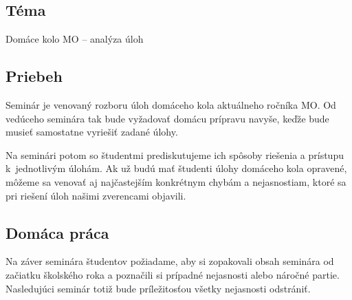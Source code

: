 
\subsection*{Téma}
Domáce kolo MO -- analýza úloh

\subsection*{Priebeh}
Seminár je venovaný rozboru úloh domáceho kola aktuálneho ročníka MO. Od vedúceho seminára tak bude vyžadovať domácu prípravu navyše, keďže bude musieť samostatne vyriešiť zadané úlohy.

Na seminári potom so študentmi prediskutujeme ich spôsoby riešenia a prístupu k~jednotlivým úlohám. Ak už budú mať študenti úlohy domáceho kola opravené, môžeme sa venovať aj najčastejším konkrétnym chybám a nejasnostiam, ktoré sa pri riešení úloh našimi zverencami objavili.

\subsection*{Domáca práca}
Na záver seminára študentov požiadame, aby si zopakovali obsah seminára od začiatku školského roka a poznačili si prípadné nejasnosti alebo náročné partie. Nasledujúci seminár totiž bude príležitosťou všetky nejasnosti odstrániť.

